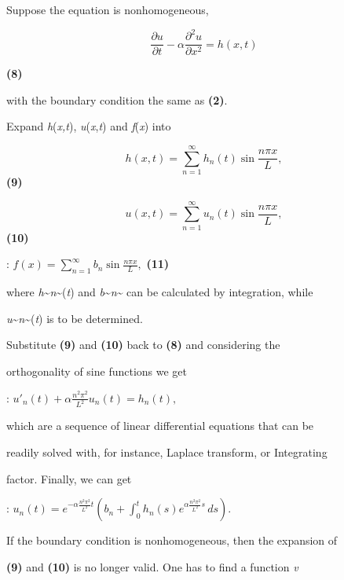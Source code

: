 Suppose the equation is nonhomogeneous,



$$\frac{\partial u}{\partial t}-\alpha\frac{\partial^{2}u}{\partial x^{2}}=h(x,t)$$

\textbf{(8)}



with the boundary condition the same as \textbf{(2)}.



Expand \textit{h}(\textit{x,t}), \textit{u}(\textit{x},\textit{t}) and \textit{f}(\textit{x}) into



$$h(x,t)=\sum_{n=1}^{\infty}h_{n}(t)\sin\frac{n\pi x}{L},$$ \textbf{(9)}



$$u(x,t)=\sum_{n=1}^{\infty}u_{n}(t)\sin\frac{n\pi x}{L},$$ \textbf{(10)}



:   $f(x)=\sum_{n=1}^{\infty}b_{n}\sin\frac{n\pi x}{L},$ \textbf{(11)}



where \textit{h}\textasciitilde{}\textit{n}\textasciitilde{}(\textit{t}) and \textit{b}\textasciitilde{}\textit{n}\textasciitilde{} can be calculated by integration, while

\textit{u}\textasciitilde{}\textit{n}\textasciitilde{}(\textit{t}) is to be determined.



Substitute \textbf{(9)} and \textbf{(10)} back to \textbf{(8)} and considering the

orthogonality of sine functions we get



:   $u'_{n}(t)+\alpha\frac{n^{2}\pi^{2}}{L^{2}}u_{n}(t)=h_{n}(t),$



which are a sequence of linear differential equations that can be

readily solved with, for instance, Laplace transform, or Integrating

factor. Finally, we can get



:   $u_{n}(t)=e^{-\alpha\frac{n^{2}\pi^{2}}{L^{2}} t} \left (b_{n}+\int_{0}^{t}h_{n}(s)e^{\alpha\frac{n^{2}\pi^{2}}{L^{2}} s} \, ds \right).$



If the boundary condition is nonhomogeneous, then the expansion of

\textbf{(9)} and \textbf{(10)} is no longer valid. One has to find a function \textit{v}

